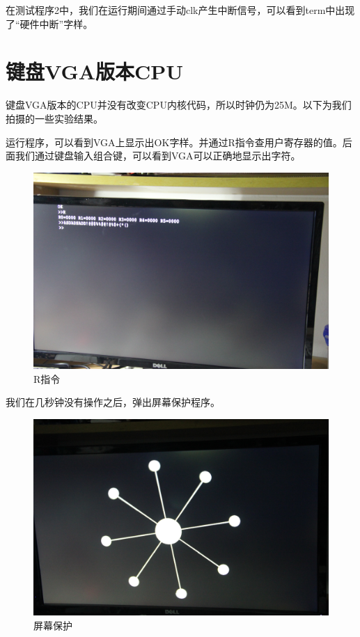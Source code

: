 在测试程序2中，我们在运行期间通过手动clk产生中断信号，可以看到term中出现了“硬件中断”字样。


\section{键盘VGA版本CPU}

键盘VGA版本的CPU并没有改变CPU内核代码，所以时钟仍为25M。以下为我们拍摄的一些实验结果。

运行程序，可以看到VGA上显示出OK字样。并通过R指令查用户寄存器的值。后面我们通过键盘输入组合键，可以看到VGA可以正确地显示出字符。

\begin{figure}[H]
  \includegraphics[width=\linewidth]{Figures/picture/IMG_7232.JPG}
  \caption{R指令}
\end{figure}

我们在几秒钟没有操作之后，弹出屏幕保护程序。

\begin{figure}[H]
  \includegraphics[width=\linewidth]{Figures/picture/IMG_7233.JPG}
  \caption{屏幕保护}
\end{figure}

